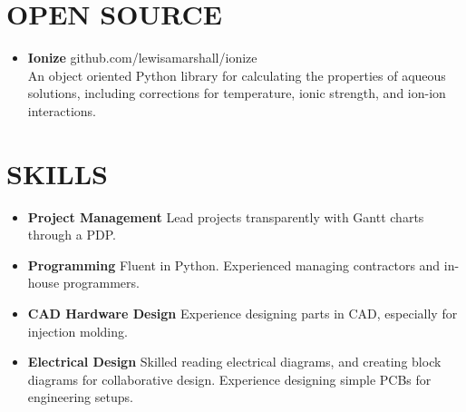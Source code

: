 \documentclass{res}
\begin{document}
\begin{resume}
 \section{OPEN SOURCE}
   \begin{itemize}
     \item \textbf{Ionize} github.com/lewisamarshall/ionize\\
   An object oriented Python library for calculating the properties of
   aqueous solutions, including corrections for temperature, ionic strength, and ion-ion interactions.
 \end{itemize}


 \section{SKILLS}
   \begin{itemize}
     \item \textbf{Project Management}	Lead projects transparently with Gantt charts through a PDP.
     \item \textbf{Programming}	Fluent in Python. Experienced managing contractors and in-house programmers. 
     \item \textbf{CAD Hardware Design} Experience designing parts in CAD, especially for injection molding. 
     \item \textbf{Electrical Design} Skilled reading electrical diagrams, and creating block diagrams for collaborative design. Experience designing simple PCBs for engineering setups. 

   \end{itemize}




\end{resume}
\end{document}
